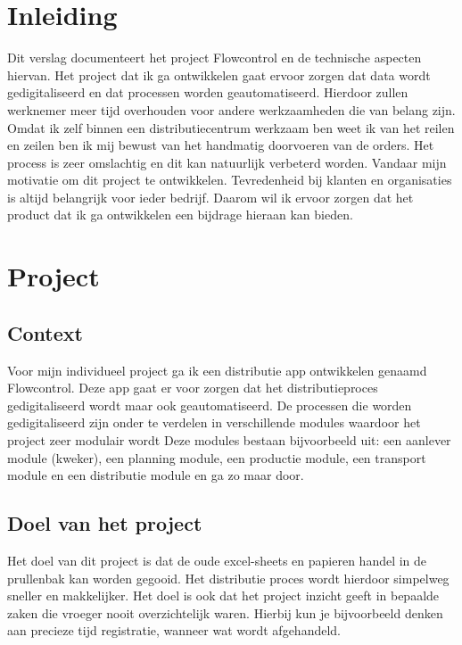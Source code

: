 \documentclass[11pt, twoside]{report}
\begin{document}
    
    \newpage
    \tableofcontents
    \newpage

    \clearpage
    \setcounter{page}{1}

    \chapter{Inleiding}
    \label{ch:inleiding}
    Dit verslag documenteert het project Flowcontrol en de technische aspecten hiervan.
    Het project dat ik ga ontwikkelen gaat ervoor zorgen dat data wordt gedigitaliseerd en dat processen worden
    geautomatiseerd.
    Hierdoor zullen werknemer meer tijd overhouden voor andere werkzaamheden die van belang zijn.
    Omdat ik zelf binnen een distributiecentrum werkzaam ben weet ik van het reilen en zeilen ben ik mij bewust van
    het handmatig doorvoeren van de orders.
    Het process is zeer omslachtig en dit kan natuurlijk verbeterd worden.
    Vandaar mijn motivatie om dit project te
    ontwikkelen.
    Tevredenheid bij klanten en organisaties is altijd belangrijk voor ieder bedrijf.
    Daarom wil ik ervoor zorgen dat het product dat ik ga ontwikkelen een bijdrage hieraan kan bieden.

    \chapter{Project}
    \label{ch:project}
    \section{Context}
    \label{sec:context}
    Voor mijn individueel project ga ik een distributie app ontwikkelen genaamd Flowcontrol.
    Deze app gaat er voor zorgen dat het distributieproces gedigitaliseerd wordt maar ook geautomatiseerd.
    De processen die worden gedigitaliseerd zijn onder te verdelen in verschillende modules waardoor het project zeer modulair wordt
    Deze modules bestaan bijvoorbeeld uit: een aanlever module (kweker), een planning module, een productie module,
    een transport module en een distributie module en ga zo maar door.

    \section{Doel van het project}
    \label{sec:doel-van-het-project}
    Het doel van dit project is dat de oude excel-sheets en papieren handel in de prullenbak kan worden gegooid.
    Het distributie proces wordt hierdoor simpelweg sneller en makkelijker.
    Het doel is ook dat het project inzicht geeft in bepaalde zaken die vroeger nooit overzichtelijk waren.
    Hierbij kun je bijvoorbeeld denken aan precieze tijd registratie, wanneer wat wordt afgehandeld.
\end{document}
